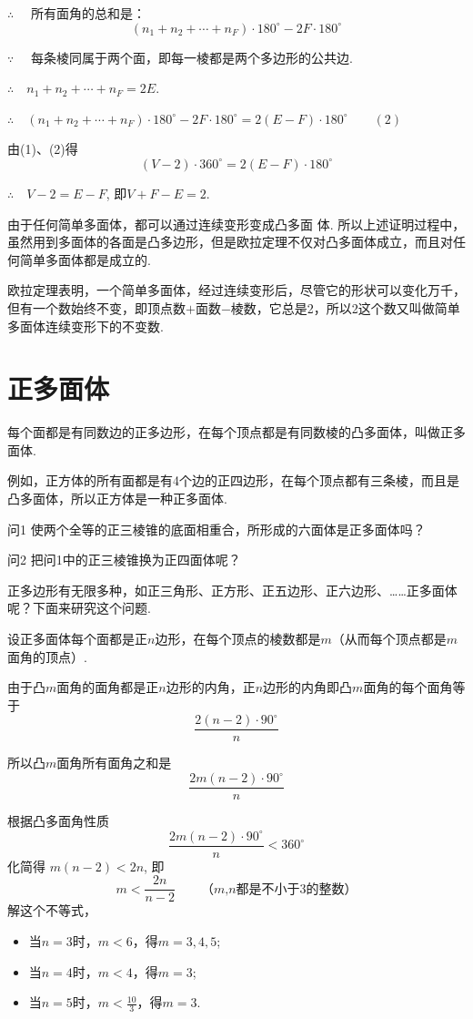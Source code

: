 $\therefore\quad$ 所有面角的总和是：
\[
\left(n_{1}+n_{2}+\cdots+n_{F}\right)\cdot  180^{\circ}-2F\cdot  180^{\circ}\]

$\because\quad$ 每条棱同属于两个面，即每一棱都是两个多边形的公共边. 

$\therefore\quad n_{1}+n_{2}+\cdots+n_{F}=2E$.

$\therefore\quad \left(n_{1}+n_{2}+\cdots+n_{F}\right)\cdot  180^{\circ}-2F\cdot  180^{\circ}
=2(E-F)\cdot  180^{\circ}\qquad (2)$

由(1)、(2)得
\[
(V-2)\cdot  360^{\circ}=2(E-F)\cdot  180^{\circ}\]

$\therefore\quad V-2=E-F$, 即$V+F-E=2$.

由于任何简单多面体，都可以通过连续变形变成凸多面
体. 所以上述证明过程中，虽然用到多面体的各面是凸多边形，但是欧拉定理不仅对凸多面体成立，而且对任何简单多面体都是成立的.

欧拉定理表明，一个简单多面体，经过连续变形后，尽管它的形状可以变化万千，但有一个数始终不变，即顶点数$+$面数$-$棱数，它总是2，所以2这个数又叫做简单多面体连续变形下的不变数.

\section{正多面体}

每个面都是有同数边的正多边形，在每个顶点都是有同数棱的凸多面体，叫做正多面体.

例如，正方体的所有面都是有4个边的正四边形，在每个顶点都有三条棱，而且是凸多面体，所以正方体是一种正多面体.

\begin{thm}
{问1} 使两个全等的正三棱锥的底面相重合，所形成的六面体是正多面体吗？
\end{thm}

\begin{thm}
{问2} 把问1中的正三棱锥换为正四面体呢？
\end{thm}


正多边形有无限多种，如正三角形、正方形、正五边形、正六边形、……正多面体呢？下面来研究这个问题.

设正多面体每个面都是正$n$边形，在每个顶点的棱数都是$m$（从而每个顶点都是$m$面角的顶点）.

由于凸$m$面角的面角都是正$n$边形的内角，正$n$边形的内角即凸$m$面角的每个面角等于
\[
\frac{2(n-2)\cdot  90^{\circ}}{n}\]

所以凸$m$面角所有面角之和是
\[
\frac{2m(n-2)\cdot  90^{\circ}}{n}\]

根据凸多面角性质
\[
\frac{2m(n-2)\cdot  90^{\circ}}{n}<360^{\circ}\]
化简得
$m(n-2)<2n$,
即
\[
m<\frac{2n}{n-2}\qquad \text{（$m$,$n$都是不小于3的整数）}\]
解这个不等式，
\begin{itemize}
    \item 当$n=3$时，$m<6$，得$m=3,4,5$;

    \item 当$n=4$时，$m<4$，得$m=3$;

    \item 当$n=5$时，$m<\frac{10}{3}$，得$m=3$.
\end{itemize}

